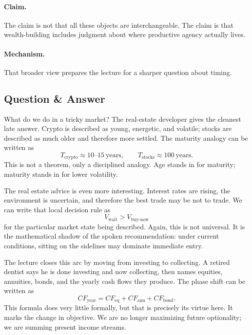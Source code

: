\paragraph{Claim.}
The claim is not that all these objects are interchangeable. The claim is that wealth-building includes judgment about where productive agency actually lives.

\paragraph{Mechanism.}
That broader view prepares the lecture for a sharper question about timing.

\subsection{Question \& Answer}

What do we do in a tricky market? The real-estate developer gives the cleanest late answer. Crypto is described as young, energetic, and volatile; stocks are described as much older and therefore more settled. The maturity analogy can be written as
\begin{equation}
T_{\text{crypto}} \approx 10\text{--}15 \ \text{years},
\qquad
T_{\text{stocks}} \approx 100 \ \text{years}.
\end{equation}
This is not a theorem, only a disciplined analogy. Age stands in for maturity; maturity stands in for lower volatility.

The real estate advice is even more interesting. Interest rates are rising, the environment is uncertain, and therefore the best trade may be not to trade. We can write that local decision rule as
\begin{equation}
V_{\text{wait}} > V_{\text{buy-now}}
\end{equation}
for the particular market state being described. Again, this is not universal. It is the mathematical shadow of the spoken recommendation: under current conditions, sitting on the sidelines may dominate immediate entry.

The lecture closes this arc by moving from investing to collecting. A retired dentist says he is done investing and now collecting, then names equities, annuities, bonds, and the yearly cash flows they produce. The phase shift can be written as
\begin{equation}
CF_{\text{year}} = CF_{\text{eq}} + CF_{\text{ann}} + CF_{\text{bond}}.
\end{equation}
This formula does very little formally, but that is precisely its virtue here. It marks the change in objective. We are no longer maximizing future optionality; we are summing present income streams.

